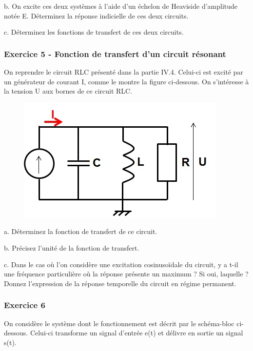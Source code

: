 	b. On excite ces deux systèmes à l'aide d'un échelon de Heaviside d'amplitude notée E. Déterminez la réponse indicielle de ces deux circuits. 
	
	c. Déterminez les fonctions de transfert de ces deux circuits.
	
	\vspace{1\baselineskip}
	
	\subsubsection{Exercice 5 - Fonction de transfert d'un circuit résonant}
	
	On reprendre le circuit RLC présenté dans la partie IV.4. Celui-ci est excité par un générateur de courant I, comme le montre la figure ci-dessous. On s'intéresse à la tension U aux bornes de ce circuit RLC. 
	
	\begin{figure}[h!]
		\centering
		\includegraphics[scale=0.5]{images/Exo_2_5.jpg} 
	\end{figure} 
	
	a. Déterminez la fonction de transfert de ce circuit. 
	
	b. Précisez l'unité de la fonction de transfert. 
	
	c. Dans le cas où l'on considère une excitation cosinusoïdale du circuit, y a t-il une fréquence particulière où la réponse présente un maximum ? Si oui, laquelle ? Donnez l'expression de la réponse temporelle du circuit en régime permanent.
	
	\vspace{1\baselineskip}
	
	\subsubsection{Exercice 6}
	
	On considère le système dont le fonctionnement est décrit par le schéma-bloc ci-dessous. Celui-ci transforme un signal d'entrée e(t) et délivre en sortie un signal s(t). 
	
